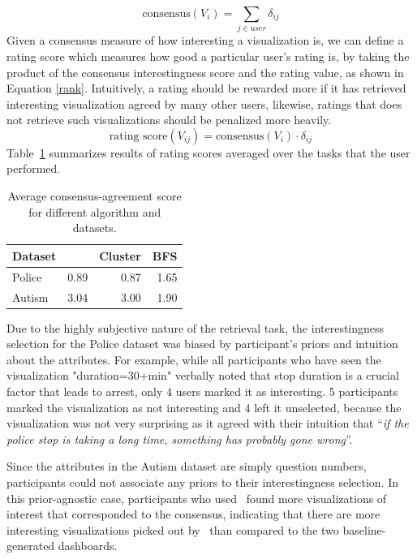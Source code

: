 \begin{equation}\label{vote}
\textrm{consensus}(V_i) =\sum_{j\in user} \delta_{ij}
\end{equation}
Given a consensus measure of how interesting a visualization is, we can define a rating score which measures how good a particular user's rating is, by taking the product of the consensus interestingness score and the rating value, as shown in Equation \ref{rank}. Intuitively, a rating should be rewarded more if it has retrieved interesting visualization agreed by many other users, likewise, ratings that does not retrieve such visualizations should be penalized more heavily.
\begin{equation}\label{rank}
\textrm{rating score}(V_{ij}) =\textrm{consensus}(V_i) \cdot \delta_{ij}
\end{equation}
Table~\ref{table:interestingScore} summarizes results of rating scores averaged over the tasks that the user performed.
\begin{table}[ht!]
	\centering
	\begin{tabular}{lrrr}
		\hline
		Dataset   &   \system &   Cluster &   BFS \\
		\hline
		 Police    &      0.89 &      0.87 &  1.65 \\
		 Autism    &      3.04 &      3.00 &  1.90 \\
		\hline
	\end{tabular}
	\caption{Average consensus-agreement score for different algorithm and datasets.}%
	\label{table:interestingScore}
\end{table}
\npar Due to the highly subjective nature of the retrieval task, the interestingness selection for the Police dataset was biased by participant's priors and intuition about the attributes. For example, while all participants who have seen the visualization "duration=30+min" verbally noted that stop duration is a crucial factor that leads to arrest, only 4 users marked it as interesting. 5 participants marked the visualization as not interesting and 4 left it unselected, because the visualization was not very surprising as it agreed with their intuition that ``\textit{if the police stop is taking a long time, something has probably gone wrong}''.
\par Since the attributes in the Autism dataset are simply question numbers, participants could not associate any priors to their interestingness selection. In this prior-agnostic case, participants who used \system\ found more visualizations of interest that corresponded to the consensus, indicating that there are more interesting visualizations picked out by \system\ than compared to the two baseline-generated dashboards.

